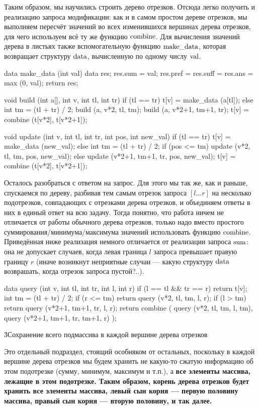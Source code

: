 Таким образом, мы научились строить дерево отрезков. Отсюда легко получить и реализацию запроса модификации: как и в самом простом дереве отрезков, мы выполняем пересчёт значений во всех изменившихся вершинах дерева отрезков, для чего используем всё ту же функцию $\rm combine$. Для вычисления значений дерева в листьях также вспомогательную функцию $\rm make\_data$, которая возвращает структуру $\rm data$, вычисленную по одному числу $\rm val$.

\code
data make_data (int val) {
	data res;
	res.sum = val;
	res.pref = res.suff = res.ans = max (0, val);
	return res;
}

void build (int a[], int v, int tl, int tr) {
	if (tl == tr)
		t[v] = make_data (a[tl]);
	else {
		int tm = (tl + tr) / 2;
		build (a, v*2, tl, tm);
		build (a, v*2+1, tm+1, tr);
		t[v] = combine (t[v*2], t[v*2+1]);
	}
}

void update (int v, int tl, int tr, int pos, int new_val) {
	if (tl == tr)
		t[v] = make_data (new_val);
	else {
		int tm = (tl + tr) / 2;
		if (pos <= tm)
			update (v*2, tl, tm, pos, new_val);
		else
			update (v*2+1, tm+1, tr, pos, new_val);
		t[v] = combine (t[v*2], t[v*2+1]);
	}
}
\endcode

Осталось разобраться с ответом на запрос. Для этого мы так же, как и раньше, спускаемся по дереву, разбивая тем самым отрезок запроса $[l \ldots r]$ на несколько подотрезков, совпадающих с отрезками дерева отрезков, и объединяем ответы в них в единый ответ на всю задачу. Тогда понятно, что работа ничем не отличается от работы обычного дерева отрезков, только надо вместо простого суммирования/минимума/максимума значений использовать функцию $\rm combine$. Приведённая ниже реализация немного отличается от реализации запроса $\rm sum$: она не допускает случаев, когда левая граница $l$ запроса превышает правую границу $r$ (иначе возникнут неприятные случаи --- какую структуру $\rm data$ возврашать, когда отрезок запроса пустой?..).

\code
data query (int v, int tl, int tr, int l, int r) {
	if (l == tl && tr == r)
		return t[v];
	int tm = (tl + tr) / 2;
	if (r <= tm)
		return query (v*2, tl, tm, l, r);
	if (l > tm)
		return query (v*2+1, tm+1, tr, l, r);
	return combine (
		query (v*2, tl, tm, l, tm),
		query (v*2+1, tm+1, tr, tm+1, r)
	);
}
\endcode


\h3{Сохранение всего подмассива в каждой вершине дерева отрезков}

Это отдельный подраздел, стоящий особняком от остальных, поскольку в каждой вершине дерева отрезков мы будем хранить не какую-то сжатую информацию об этом подотрезке (сумму, минимум, максимум и т.п.), а \bf{все} элементы массива, лежащие в этом подотрезке. Таким образом, корень дерева отрезков будет хранить все элементы массива, левый сын корня --- первую половину массива, правый сын корня --- вторую половину, и так далее.

